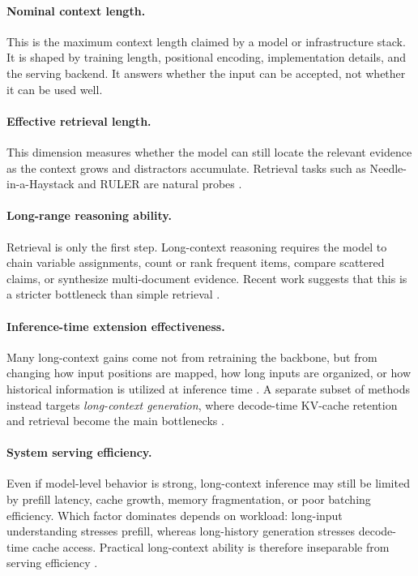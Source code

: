 \documentclass[11pt]{article}
\begin{document}
\paragraph{Nominal context length.}
This is the maximum context length claimed by a model or infrastructure stack. It is shaped by training length, positional encoding, implementation details, and the serving backend. It answers whether the input can be accepted, not whether it can be used well.

\paragraph{Effective retrieval length.}
This dimension measures whether the model can still locate the relevant evidence as the context grows and distractors accumulate. Retrieval tasks such as Needle-in-a-Haystack and RULER are natural probes \citep{liu2024lost, hsieh2024ruler}.

\paragraph{Long-range reasoning ability.}
Retrieval is only the first step. Long-context reasoning requires the model to chain variable assignments, count or rank frequent items, compare scattered claims, or synthesize multi-document evidence. Recent work suggests that this is a stricter bottleneck than simple retrieval \citep{hsieh2024ruler, kuratov2024babilong, bai2025longbenchv2}.

\paragraph{Inference-time extension effectiveness.}
Many long-context gains come not from retraining the backbone, but from changing how input positions are mapped, how long inputs are organized, or how historical information is utilized at inference time \citep{chen2023pi, peng2023yarn, ding2024longrope, jin2024selfextend, xiao2024infllm}. A separate subset of methods instead targets \emph{long-context generation}, where decode-time KV-cache retention and retrieval become the main bottlenecks \citep{xiao2023streamingllm, zhang2023h2o, li2024snapkv, liu2024kivi, wang2025fier}.

\paragraph{System serving efficiency.}
Even if model-level behavior is strong, long-context inference may still be limited by prefill latency, cache growth, memory fragmentation, or poor batching efficiency. Which factor dominates depends on workload: long-input understanding stresses prefill, whereas long-history generation stresses decode-time cache access. Practical long-context ability is therefore inseparable from serving efficiency \citep{dao2022flashattention, dao2023flashattention2, kwon2023pagedattention, zheng2024sglang}.
\end{document}
